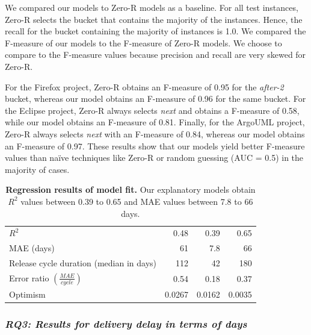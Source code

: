 \noindent{} We compared our models to Zero-R models as a baseline. For all test
instances, Zero-R selects the bucket that contains the majority of the instances.
Hence, the recall for the bucket containing the majority of instances is 1.0. We
compared the F-measure of our models to the F-measure of Zero-R models. We
choose to compare to the F-measure values because precision and recall are very
skewed for Zero-R. 

For the Firefox project, Zero-R obtains an F-measure of 0.95 for the
\textit{after-2} bucket, whereas our model obtains an F-measure of 0.96 for the
same bucket. For the Eclipse project, Zero-R always selects \textit{next} and
obtains a F-measure of 0.58, while our model obtains an F-measure of 0.81.
Finally, for the ArgoUML project, Zero-R always selects \textit{next} with an
F-measure of 0.84, whereas our model obtains an F-measure of 0.97. These results
show that our models yield better F-measure values than na\"{i}ve techniques
like Zero-R or random guessing (AUC = 0.5) in the majority of cases.  


\begin{table}
	\centering
	\footnotesize
	\caption{\textbf{Regression results of model fit.} Our explanatory
		models obtain $R^2$ values between 0.39 to 0.65 and MAE values between
	7.8 to 66 days.}
	\label{ch4:tbl:regression_results}
	\def\arraystretch{1.5}
	\begin{tabular}{lrrr}
		\hline 
		\centering{\textbf{Metric/Project}} &
		\centering{\textbf{Eclipse}} & \centering{\textbf{Firefox}} &
		\centering{\textbf{ArgoUML}} \tabularnewline
		\hline 
		$R^2$ & 0.48  & 0.39 & 0.65 \tabularnewline
		\hline 
		MAE (days) & 61 & 7.8  & 66 \tabularnewline
		\hline 
		Release cycle duration (median in days) & 112 & 42 & 180 \tabularnewline
		\hline
		Error ratio $(\frac{MAE}{cycle})$ & 0.54  & 0.18  & 0.37 \tabularnewline
		\hline 
		Optimism & 0.0267 & 0.0162 & 0.0035 \tabularnewline
		\hline 
	\end{tabular}
\end{table}

\subsubsection*{\textit{\textbf{RQ3: Results for delivery delay in terms of days}}}

